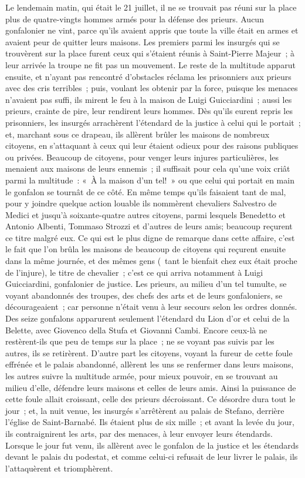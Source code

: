 \documentclass[french,twoside]{book} %
\newenvironment{quoteblock}%
  {\begin{quoting}}
  {\end{quoting}}
\newenvironment{quotebar}{%
    \def\FrameCommand{{\color{rubric!10!}\vrule width 0.5em} \hspace{0.9em}}%
    \def\OuterFrameSep{\itemsep} %
    \MakeFramed {\advance\hsize-\width \FrameRestore}
  }%
  {%
    \endMakeFramed
  }
\renewenvironment{quoteblock}%
  {%
    \savenotes
    \setstretch{0.9}
    \normalfont
    \begin{quotebar}
  }
  {%
    \end{quotebar}
    \spewnotes
  }
\begin{document}
\begin{quoteblock}
 Le lendemain matin, qui était le 21 juillet, il ne se trouvait pas réuni sur la place plus de quatre-vingts hommes armés pour la défense des prieurs. Aucun gonfalonier ne vint, parce qu'ils avaient appris que toute la ville était en armes et avaient peur de quitter leurs maisons. Les premiers parmi les insurgés qui se trouvèrent sur la place furent ceux qui s'étaient réunis à Saint-Pierre Majeur ; à leur arrivée la troupe ne fit pas un mouvement. Le reste de la multitude appa­rut ensuite, et n'ayant pas rencontré d'obstacles réclama les prisonniers aux prieurs avec des cris terribles ; puis, voulant les obtenir par la force, puisque les menaces n'avaient pas suffi, ils mirent le feu à la maison de Luigi Guicciardini ; aussi les prieurs, crainte de pire, leur rendirent leurs hommes. Dès qu'ils eurent repris les prisonniers, les insurgés arrachèrent l'étendard de la justice à celui qui le portait ; et, marchant sous ce drapeau, ils allèrent brûler les maisons de nombreux citoyens, en s'attaquant à ceux qui leur étaient odieux pour des raisons publiques ou privées. Beaucoup de citoyens, pour venger leurs injures particulières, les menaient aux maisons de leurs ennemis ; il suffisait pour cela qu'une voix criât parmi la multitude : « À la maison d'un tel! » ou que celui qui portait en main le gonfalon se tournât de ce côté. En même temps qu'ils faisaient tant de mal, pour y joindre quelque action louable ils nommèrent chevaliers Salvestro de Medici et jusqu'à soixante-quatre autres citoyens, parmi lesquels Benedetto et Antonio Albenti, Tommaso Strozzi et d'autres de leurs amis; beaucoup reçurent ce titre malgré eux. Ce qui est le plus digne de remarque dans cette affaire, c'est le fait que l'on brûla les maisons de beaucoup de citoyens qui reçurent ensuite dans la même journée, et des mêmes gens ( tant le bienfait chez eux était proche de l'injure), le titre de chevalier ; c'est ce qui arriva notamment à Luigi Guicciardini, gonfalonier de justice. Les prieurs, au milieu d'un tel tumulte, se voyant abandonnés des troupes, des chefs des arts et de leurs gonfaloniers, se décourageaient ; car personne n'était venu à leur secours selon les ordres donnés. Des seize gonfalons apparurent seulement l'étendard du Lion d'or et celui de la Belette, avec Giovenco della Stufa et Giovanni Cambi. Encore ceux-là ne restèrent-ils que peu de temps sur la place ; ne se voyant pas suivis par les autres, ils se retirèrent. D'autre part les citoyens, voyant la fureur de cette foule effrénée et le palais abandonné, allèrent les uns se renfermer dans leurs maisons, les autres suivre la multitude armée, pour mieux pouvoir, en se trouvant au milieu d'elle, défendre leurs maisons et celles de leurs amis. Ainsi la puissance de cette foule allait croissant, celle des prieurs décroissant. Ce désordre dura tout le jour ; et, la nuit venue, les insurgés s'arrêtèrent au palais de Stefano, derrière l'église de Saint-Barnabé. Ils étaient plus de six mille ; et avant la levée du jour, ils contraignirent les arts, par des menaces, à leur envoyer leurs éten­dards. Lorsque le jour fut venu, ils allèrent avec le gonfalon de la justice et les étendards devant le palais du podestat, et comme celui-ci refusait de leur livrer le palais, ils l'attaquèrent et triomphèrent.\par

\end{quoteblock}
\end{document}
